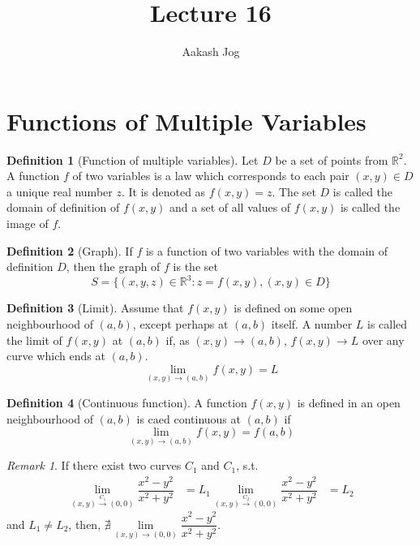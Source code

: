 \documentclass[fleqn, a4paper, 12pt]{article}
\title{Lecture 16}
\author{Aakash Jog}
\date{\formatdate{23}{12}{2014}}
\theoremstyle{definition}
\newtheorem{definition}{Definition}
\theoremstyle{theorem}
\theoremstyle{remark}
\newtheorem{remark}{Remark}
\begin{document}
	
\maketitle

\tableofcontents

\newpage

\section{Functions of Multiple Variables}

\begin{definition}[Function of multiple variables]
	Let $D$ be a set of points from $\mathbb{R}^2$. A function $f$ of two variables is a law which corresponds to each pair $(x, y) \in D$ a unique real number $z$. It is denoted as $f(x, y) = z$. The set $D$ is called the domain of definition of $f(x, y)$ and a set of all values of $f(x, y)$ is called the image of $f$.
\end{definition}

\begin{definition}[Graph]
	If $f$ is a function of two variables with the domain of definition $D$, then the graph of $f$ is the set 
	\begin{equation*}
		S = \{(x, y, z) \in \mathbb{R}^3 : z = f(x, y), (x, y) \in D\}
	\end{equation*}
\end{definition}

\begin{definition}[Limit]
	Assume that $f(x, y)$ is defined on some open neighbourhood of $(a, b)$, except perhaps at $(a, b)$ itself. A number $L$ is called the limit of $f(x, y)$ at $(a, b)$ if, as $(x, y) \to (a, b)$, $f(x, y) \to L$ over any curve which ends at $(a, b)$.
	\begin{equation*}
		\lim\limits_{(x,y) \to (a,b)} f(x,y) = L
	\end{equation*}
\end{definition}

\begin{definition}[Continuous function]
	A function $f(x, y)$ is defined in an open neighbourhood of $(a,b)$ is caed continuous at $(a,b)$ if
	\begin{equation*}
		\lim\limits_{(x,y) \to (a,b)} f(x,y) = f(a,b)
	\end{equation*}
\end{definition}

\begin{remark}
	If there exist two curves $C_1$ and $C_1$, s.t. 
	\begin{align*}
	\lim\limits_{(x,y) \stackrel{C_1}{\to} (0,0)} \dfrac{x^2 - y^2}{x^2 + y^2} &= L_1
	\lim\limits_{(x,y) \stackrel{C_2}{\to} (0,0)} \dfrac{x^2 - y^2}{x^2 + y^2} &= L_2
	\end{align*}
	and $L_1 \neq L_2$, then, $\nexists \lim\limits_{(x,y) \to (0,0)} \dfrac{x^2 - y^2}{x^2 + y^2}$.
\end{remark}
\end{document}
